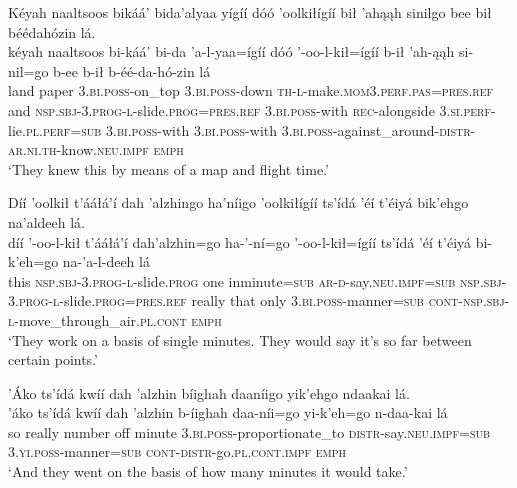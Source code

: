 \ea\label{ex:text9-13-2}
Kéyah naaltsoos bikáá’ bida’alyaa yígíí dóó ’oolkiłígíí bił ’ahąąh sinilgo bee bił béédahózin lá.\\
\gll kéyah naaltsoos bi-káá’ bi-da ’a-l-yaa=ígíí	dóó	’-oo-l-kił=ígíí	b-ił	’ah-ąąh	si-nil=go	b-ee	b-ił	b-éé-da-hó-zin	lá\\
     land paper 3.\textsc{bi}.\textsc{poss}-on\_top 3.\textsc{bi}.\textsc{poss}-down \textsc{th}-\textsc{l}-make.\textsc{mom}3.\textsc{perf}.\textsc{pas}=\textsc{pres}.\textsc{ref}	and	\textsc{nsp}.\textsc{sbj}-3.\textsc{prog}-\textsc{l}-slide.\textsc{prog}=\textsc{pres}.\textsc{ref}	3.\textsc{bi}.\textsc{poss}-with	\textsc{rec}-alongside	3.\textsc{si}.\textsc{perf}-lie.\textsc{pl}.\textsc{perf}=\textsc{sub}	3.\textsc{bi}.\textsc{poss}-with	3.\textsc{bi}.\textsc{poss}-with	3.\textsc{bi}.\textsc{poss}-against\_around-\textsc{distr}-\textsc{ar}.\textsc{ni}.\textsc{th}-know.\textsc{neu}.\textsc{impf}	\textsc{emph}\\
\glt `They knew this by means of a map and flight time.'
\z

\ea\label{ex:text9-13-3}
Díí ’oolkił t’ááłá’í dah ’alzhingo ha’níigo ’oolkiłígíí ts’ídá ’éí t’éiyá bik’ehgo na’aldeeh lá.\\
\gll díí	’-oo-l-kił	t’ááłá’í	dah’alzhin=go	ha-’-ní=go	’-oo-l-kił=ígíí	ts’ídá	’éí	t’éiyá	bi-k’eh=go	na-’a-l-deeh	lá\\
     this	\textsc{nsp}.\textsc{sbj}-3.\textsc{prog}-\textsc{l}-slide.\textsc{prog}	one	inminute=\textsc{sub}	\textsc{ar}-\textsc{d}-say.\textsc{neu}.\textsc{impf}=\textsc{sub}	\textsc{nsp}.\textsc{sbj}-3.\textsc{prog}-\textsc{l}-slide.\textsc{prog}=\textsc{pres}.\textsc{ref}	really	that	only	3.\textsc{bi}.\textsc{poss}-manner=\textsc{sub}	\textsc{cont}-\textsc{nsp}.\textsc{sbj}-\textsc{l}-move\_through\_air.\textsc{pl}.\textsc{cont}	\textsc{emph}\\
\glt `They work on a basis of single minutes. They would say it's so far between certain points.'
\z

\ea\label{ex:text9-13-4}
’Áko ts’ídá kwíí dah ’alzhin bíighah daaníigo yik’ehgo ndaakai lá.\\
\gll ’áko	ts’ídá	kwíí	dah	’alzhin	b-íighah	daa-níi=go	yi-k’eh=go	n-daa-kai	lá\\
     so	really	number	off	minute	3.\textsc{bi}.\textsc{poss}-proportionate\_to	\textsc{distr}-say.\textsc{neu}.\textsc{impf}=\textsc{sub}	3.\textsc{yi}.\textsc{poss}-manner=\textsc{sub}	\textsc{cont}-\textsc{distr}-go.\textsc{pl}.\textsc{cont}.\textsc{impf}	\textsc{emph}\\
\glt `And they went on the basis of how many minutes it would take.'
\z

